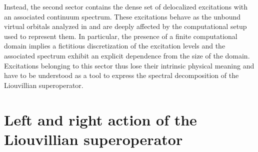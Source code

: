 \documentclass[reprint,aps,prb]{revtex4-1}
\newcommand{\lb}{\label}
\begin{document}
Instead, the second sector contains the dense set of delocalized excitations with an associated continuum spectrum. These excitations behave as the unbound virtual orbitals analyzed in \cite{boffi2016} 
and are deeply affected by the computational setup used to represent them. In particular, the presence of a finite computational domain implies a fictitious discretization of the excitation levels and 
the associated spectrum exhibit an explicit dependence from the size of the domain. Excitations belonging to this sector thus lose their intrinsic physical meaning and have to be understood as a tool to 
express the spectral decomposition of the Liouvillian superoperator. 



\appendix
\section{Left and right action of the Liouvillian superoperator}\lb{LiouvillianAction}
\end{document}
